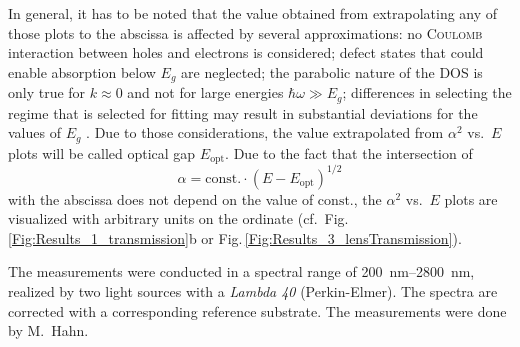 In general, it has to be noted that the value obtained from extrapolating any of those plots to the abscissa is affected by several approximations:
    no \textsc{Coulomb} interaction between holes and electrons is considered;
    defect states that could enable absorption below $E_g$ are neglected;
    the parabolic nature of the \gls{DOS} is only true for $k\approx0$ and not for large energies $\hbar\omega\gg E_g$;
    differences in selecting the regime that is selected for fitting may result in substantial deviations for the values of $E_g$
    \cite{zanatta2019}.
Due to those considerations, the value extrapolated from $\alpha^2$ vs.\ $E$ plots will be called optical gap $E_\mathrm{opt}$.
Due to the fact that the intersection of 
\begin{equation*}
    \alpha=\mathrm{const.}\cdot(E-E_\mathrm{opt})^{1/2}
\end{equation*}
with the abscissa does not depend on the value of $\mathrm{const.}$, the $\alpha^2$ vs.\ $E$ plots are visualized with arbitrary units on the ordinate (cf.\ Fig.\,\ref{Fig:Results_1_transmission}b or Fig.\,\ref{Fig:Results_3_lensTransmission}).

The measurements were conducted in a spectral range of \qtyrange{200}{2800}{\nm}, realized by two light sources with a \textit{Lambda 40} (Perkin-Elmer).
The spectra are corrected with a corresponding reference substrate.
The measurements were done by M.\ Hahn.